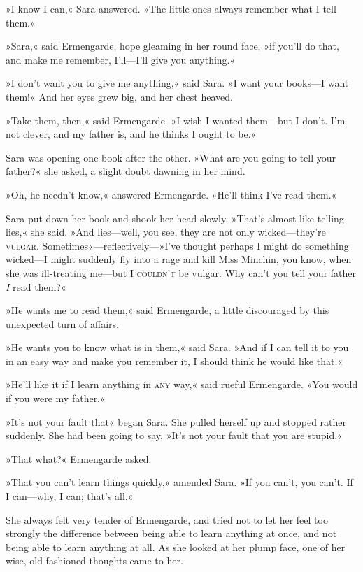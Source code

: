 »I know I can,« Sara answered. »The little ones always remember what I tell them.«

»Sara,« said Ermengarde, hope gleaming in her round face, »if you'll do that, and make me remember, I'll—I'll give you anything.«

»I don't want you to give me anything,« said Sara. »I want your books—I want them!« And her eyes grew big, and her chest heaved.

»Take them, then,« said Ermengarde. »I wish I wanted them—but I don't. I'm not clever, and my father is, and he thinks I ought to be.«

Sara was opening one book after the other. »What are you going to tell your father?« she asked, a slight doubt dawning in her mind.

»Oh, he needn't know,« answered Ermengarde. »He'll think I've read them.«

Sara put down her book and shook her head slowly. »That's almost like telling lies,« she said. »And lies—well, you see, they are not only wicked—they're \textsc{vulgar}. Sometimes«—reflectively—»I've thought perhaps I might do something wicked—I might suddenly fly into a rage and kill Miss Minchin, you know, when she was ill-treating me—but I \textsc{couldn't} be vulgar. Why can't you tell your father \textit{I} read them?«

»He wants me to read them,« said Ermengarde, a little discouraged by this unexpected turn of affairs.

»He wants you to know what is in them,« said Sara. »And if I can tell it to you in an easy way and make you remember it, I should think he would like that.«

»He'll like it if I learn anything in \textsc{any} way,« said rueful Ermengarde. »You would if you were my father.«

»It's not your fault that\longdash« began Sara. She pulled herself up and stopped rather suddenly. She had been going to say, »It's not your fault that you are stupid.«

»That what?« Ermengarde asked.

»That you can't learn things quickly,« amended Sara. »If you can't, you can't. If I can—why, I can; that's all.«

She always felt very tender of Ermengarde, and tried not to let her feel too strongly the difference between being able to learn anything at once, and not being able to learn anything at all. As she looked at her plump face, one of her wise, old-fashioned thoughts came to her.

